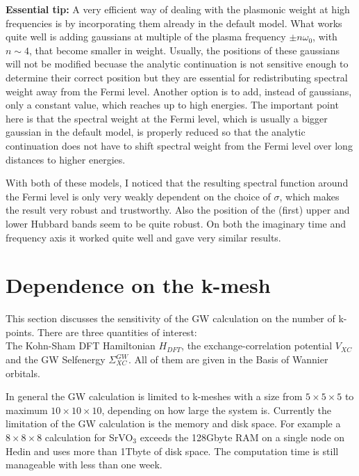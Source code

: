 \documentclass[12pt,a4paper]{scrartcl}
\numberwithin{equation}{section}
\begin{document}
\textbf{Essential tip:}
A very efficient way of dealing with the plasmonic weight at high frequencies
is by incorporating them already in the default model. What works quite well
is adding gaussians  at multiple of the plasma frequency 
$\pm n\omega_0$, with $n\sim 4$, that become smaller in weight.
Usually, the positions of these gaussians will not be modified becuase the 
analytic continuation is not sensitive enough to determine their correct position
but they are essential for redistributing spectral weight away from the Fermi level.
Another option is to add, instead of gaussians, only a constant value,
which reaches up to high energies. The important point here is that 
the spectral weight at the Fermi level, which is usually a bigger gaussian in
the default model, is properly reduced so that the analytic continuation
does not have to shift spectral weight from the Fermi level over long distances to higher
energies.

With both of these models, I noticed that the resulting spectral
function around the Fermi level is only very weakly dependent on the choice
of $\sigma$, which makes the result very robust and trustworthy.  
Also the position of the (first) upper and lower Hubbard bands seem to be 
quite robust. On both the imaginary time and frequency axis it worked quite well
and gave very similar results.



\clearpage

\section{Dependence on the k-mesh}

This section discusses the sensitivity of the GW calculation on the number of
k-points. There are three quantities of interest:\\
The Kohn-Sham DFT Hamiltonian $H_{DFT}$, the exchange-correlation
potential $V_{XC}$  and the GW Selfenergy $\Sigma^{GW}_{XC}$.
All of them are given in the Basis of Wannier orbitals.

In general the GW calculation is limited to k-meshes with a size from
$5\times 5\times 5$ to maximum $10\times 10\times 10$, depending on how large the system
is. Currently the limitation of the GW calculation is the memory and disk space.
For example a $8\times 8\times 8$ calculation for SrVO$_3$ exceeds the 128Gbyte
RAM on a single node on Hedin and uses more than 1Tbyte of disk space.
The computation time is still manageable with less than one week.
\end{document}
